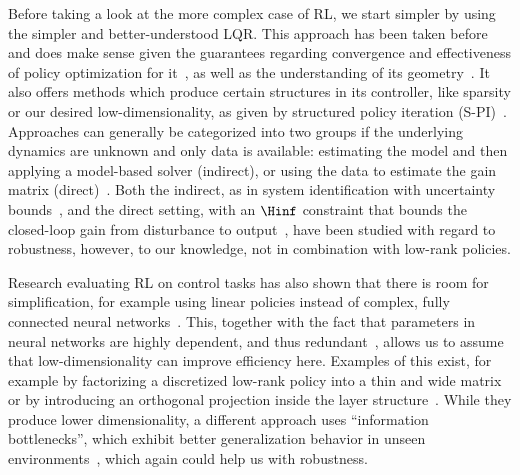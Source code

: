 Before taking a look at the more complex case of RL, we start simpler by
using the simpler and better-understood LQR. This approach has been taken
before~\cite{Recht2019Tour} and does make sense given the guarantees regarding convergence and
effectiveness of policy optimization for it~\cite{Fazel2018Global,Takakura2023Structured}, as well
as the understanding of its geometry~\cite{Talebi2024Policy}.
It also offers methods which produce certain structures in its controller, like sparsity or our desired
low-dimensionality, as given by structured policy
iteration (S-PI)~\cite{Park2020Structured}. Approaches can generally be categorized into two groups if the underlying dynamics
are unknown and only data is available: estimating the model and then applying a model-based solver (indirect), or using the data
to estimate the gain matrix (direct)~\cite{Zhao2024DataEnabled}. Both the indirect, as in system identification
with uncertainty bounds~\cite{Dean2020Sample}, and the direct setting, with an $\Hinf$ constraint
that bounds the closed-loop gain from disturbance to output~\cite{Zhang2021Policy},
have been studied with regard to robustness, however, to our knowledge, not in combination with low-rank policies.

Research evaluating RL on control tasks has also shown that there is room for simplification, for
example using linear policies instead of complex, fully connected neural
networks~\cite{Mania2018Simple,Rajeswaran2017Towards}. This, together with the
fact that parameters in neural networks are highly dependent, and thus redundant~\cite{Denil2013Predicting}, allows us to assume that
low-dimensionality can improve efficiency here. Examples of this exist, for example by factorizing a discretized low-rank
policy into a thin and wide matrix~\cite{Rozada2024Matrix} or by introducing an orthogonal projection inside the layer
structure~\cite{Todorov2026Orthogonal}. While they produce lower dimensionality, a different approach uses ``information bottlenecks'',
which exhibit better generalization behavior in unseen environments~\cite[Sec.~4.2]{Igl2019Generalization},
which again could help us with robustness.

